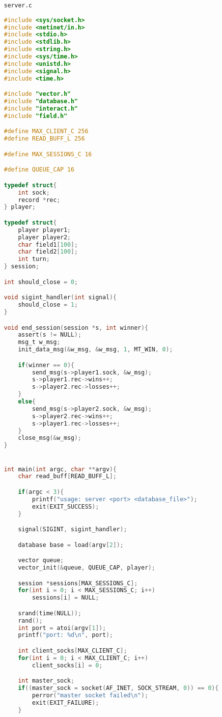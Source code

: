 \documentclass[12pt]{article}
\begin{document}
\verb|server.c|
\begin{lstlisting}[language=C, basicstyle=\scriptsize]
#include <sys/socket.h>
#include <netinet/in.h>
#include <stdio.h>
#include <stdlib.h>
#include <string.h>
#include <sys/time.h>
#include <unistd.h>
#include <signal.h>
#include <time.h>

#include "vector.h"
#include "database.h"
#include "interact.h"
#include "field.h"

#define MAX_CLIENT_C 256
#define READ_BUFF_L 256

#define MAX_SESSIONS_C 16

#define QUEUE_CAP 16

typedef struct{
    int sock;
    record *rec;
} player;

typedef struct{
    player player1;
    player player2;
    char field1[100];
    char field2[100];
    int turn;
} session;

int should_close = 0;

void sigint_handler(int signal){
    should_close = 1;
}

void end_session(session *s, int winner){
    assert(s != NULL);
    msg_t w_msg;
    init_data_msg(&w_msg, &w_msg, 1, MT_WIN, 0);

    if(winner == 0){
        send_msg(s->player1.sock, &w_msg);
        s->player1.rec->wins++;
        s->player2.rec->losses++;
    }
    else{
        send_msg(s->player2.sock, &w_msg);
        s->player2.rec->wins++;
        s->player1.rec->losses++;
    }
    close_msg(&w_msg);
}


int main(int argc, char **argv){
    char read_buff[READ_BUFF_L];

    if(argc < 3){
        printf("usage: server <port> <database_file>");
        exit(EXIT_SUCCESS);
    }

    signal(SIGINT, sigint_handler);

    database base = load(argv[2]);

    vector queue;
    vector_init(&queue, QUEUE_CAP, player);

    session *sessions[MAX_SESSIONS_C];
    for(int i = 0; i < MAX_SESSIONS_C; i++)
        sessions[i] = NULL;

    srand(time(NULL));
    rand();
    int port = atoi(argv[1]);
    printf("port: %d\n", port);

    int client_socks[MAX_CLIENT_C];
    for(int i = 0; i < MAX_CLIENT_C; i++)
        client_socks[i] = 0;

    int master_sock;
    if((master_sock = socket(AF_INET, SOCK_STREAM, 0)) == 0){
        perror("master socket failed\n");
        exit(EXIT_FAILURE);
    }
    

\end{lstlisting}
\end{document}
